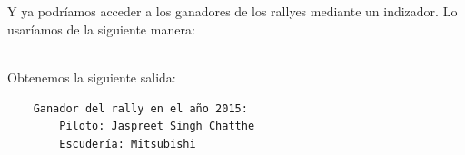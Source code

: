 \documentclass[11pt, oneside]{book}		%
\begin{document}
\\\\\begin{minipage}[c]{0.95\textwidth}
	
\end{minipage}
Y ya podríamos acceder a los ganadores de los rallyes mediante un indizador. Lo usaríamos de la siguiente manera:
\\\\\begin{minipage}[c]{0.95\textwidth}
	
\end{minipage}
Obtenemos la siguiente salida:
\begin{verbatim}
	Ganador del rally en el año 2015:
	    Piloto: Jaspreet Singh Chatthe
	    Escudería: Mitsubishi
\end{verbatim}
\end{document}
